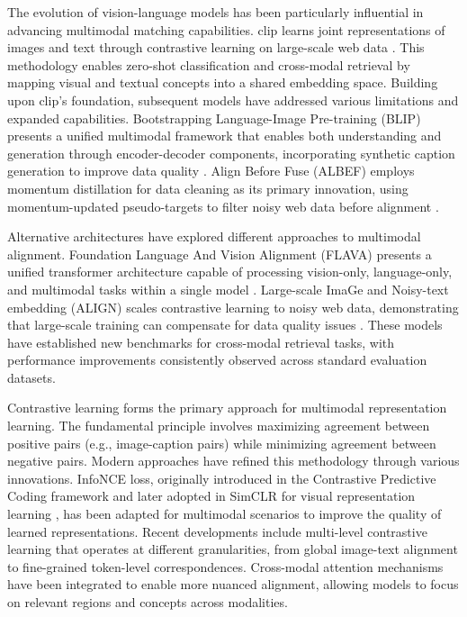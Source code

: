 The evolution of vision-language models has been particularly influential in advancing multimodal matching capabilities. \ac{clip} learns joint representations of images and text through contrastive learning on large-scale web data \cite{Radford2021}. This methodology enables zero-shot classification and cross-modal retrieval by mapping visual and textual concepts into a shared embedding space. Building upon \ac{clip}'s foundation, subsequent models have addressed various limitations and expanded capabilities. Bootstrapping Language-Image Pre-training (BLIP) presents a unified multimodal framework that enables both understanding and generation through encoder-decoder components, incorporating synthetic caption generation to improve data quality \cite{Li2022}. Align Before Fuse (ALBEF) employs momentum distillation for data cleaning as its primary innovation, using momentum-updated pseudo-targets to filter noisy web data before alignment \cite{Li2021}.

Alternative architectures have explored different approaches to multimodal alignment. Foundation Language And Vision Alignment (FLAVA) presents a unified transformer architecture capable of processing vision-only, language-only, and multimodal tasks within a single model \cite{Singh2022}. Large-scale ImaGe and
Noisy-text embedding (ALIGN) scales contrastive learning to noisy web data, demonstrating that large-scale training can compensate for data quality issues \cite{Jia2021}. These models have established new benchmarks for cross-modal retrieval tasks, with performance improvements consistently observed across standard evaluation datasets.

Contrastive learning forms the primary approach for multimodal representation learning. The fundamental principle involves maximizing agreement between positive pairs (e.g., image-caption pairs) while minimizing agreement between negative pairs. Modern approaches have refined this methodology through various innovations. InfoNCE loss, originally introduced in the Contrastive Predictive Coding framework \cite{VanDenOord2018} and later adopted in SimCLR for visual representation learning \cite{Chen2020}, has been adapted for multimodal scenarios to improve the quality of learned representations. Recent developments include multi-level contrastive learning that operates at different granularities, from global image-text alignment to fine-grained token-level correspondences. Cross-modal attention mechanisms have been integrated to enable more nuanced alignment, allowing models to focus on relevant regions and concepts across modalities.

